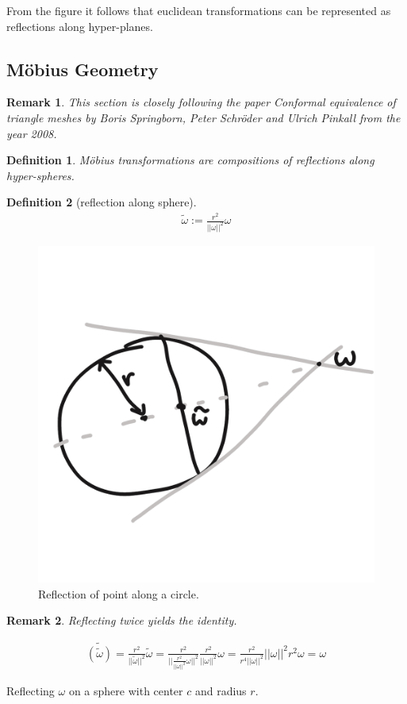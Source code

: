\documentclass[]{article}
\newtheorem{definition}{Definition}
\newtheorem{remark}{Remark}
\begin{document}
From the figure it follows that euclidean transformations can be represented as reflections along hyper-planes.

\subsection{Möbius Geometry}

\begin{remark}
	This section is closely following the paper Conformal equivalence of triangle meshes by Boris Springborn, Peter Schröder and Ulrich Pinkall from the year 2008.
\end{remark}


\begin{definition}
	Möbius transformations are compositions of reflections along hyper-spheres.
\end{definition}

\begin{definition}[reflection along sphere]	
	\begin{align*}
		\tilde{\omega} := \frac{r^2}{||\omega||^2}\omega
	\end{align*}
\end{definition}

\begin{figure}[h!]
	\centering
	\includegraphics[width=0.3\linewidth]{figures/reflection_on_circle}
	\caption{Reflection of point along a circle.}
	\label{fig:reflection_on_circle}
\end{figure}

\begin{remark}
	Reflecting twice yields the identity.
	
	\begin{align*}
		\tilde{(\tilde{\omega})} = \frac{r^2}{||\tilde{\omega}||^2}\tilde{\omega} = \frac{r^2}{||\frac{r^2}{||\omega||^2}\omega||^2}\frac{r^2}{||\omega||^2}\omega = \frac{r^2}{r^4||\omega||^2}||\omega||^2 r^2 \omega = \omega
	\end{align*}
\end{remark}

Reflecting $\omega$ on a sphere with center $c$ and radius $r$.
\end{document}
